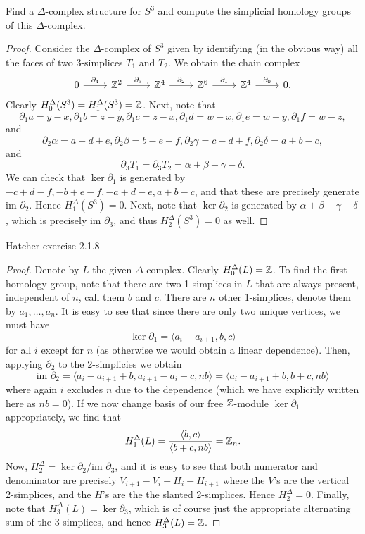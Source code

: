 \documentclass{../../mathnotes}
\begin{document}
\begin{prop}
    Find a $\Delta$-complex structure for $S^3$ and compute the simplicial homology groups
    of this $\Delta$-complex.
\end{prop}
\begin{proof}
    Consider the $\Delta$-complex of $S^3$ given by identifying (in the obvious way) all the faces of two 3-simplices $T_1$ and $T_2$.
    We obtain the chain complex
    \begin{equation*}
        \begin{tikzcd}
            0\arrow{r}{\partial_4}&\Z^2\arrow{r}{\partial_3}&\Z^4\arrow{r}{\partial_2}&\Z^6\arrow{r}{\partial_1}&\Z^4\arrow{r}{\partial_0}&0.
        \end{tikzcd}
    \end{equation*}
    Clearly $H^\Delta_0(S^3)=H^\Delta_1(S^3)=\mathbb{Z}$. Next, note that
    \[\partial_1a=y-x,\partial_1b=z-y,\partial_1c=z-x,\partial_1d=w-x,\partial_1e=w-y,\partial_1f=w-z,\]
    and
    \[\partial_2\alpha=a-d+e,\partial_2\beta=b-e+f,\partial_2\gamma=c-d+f,\partial_2\delta=a+b-c,\]
    and
    \[\partial_3T_1=\partial_3T_2=\alpha+\beta-\gamma-\delta.\]
    We can check that $\ker\partial_1$ is generated by $-c+d-f,-b+e-f,-a+d-e,a+b-c$, and that these are precisely generate
    $\text{im }\partial_2$. Hence $H^\Delta_1(S^3)=0$. Next, note that $\ker\partial_2$ is generated by $\alpha+\beta-\gamma-\delta$,
    which is precisely $\text{im }\partial_3$, and thus $H^\Delta_2(S^3)=0$ as well.
\end{proof}


\begin{prop}
    Hatcher exercise 2.1.8
\end{prop}
\begin{proof}
    Denote by $L$ the given $\Delta$-complex. Clearly $H^\Delta_0(L)=\mathbb{Z}$. To find the first homology group, note that
    there are two 1-simplices in $L$ that are always present, independent of $n$, call them $b$ and $c$. There are $n$
    other 1-simplices, denote them by $a_1,\ldots,a_n$. It is easy to see that since there are only two unique vertices,
    we must have
    \[\ker\partial_1=\langle a_i-a_{i+1},b,c\rangle\]
    for all $i$ except for $n$ (as otherwise we would obtain a linear dependence). Then, applying $\partial_2$
    to the 2-simplicies we obtain
    \[\text{im }\partial_2=\langle a_i-a_{i+1}+b, a_{i+1}-a_i+c,nb\rangle=\langle a_i-a_{i+1}+b,b+c,nb\rangle \]
    where again $i$ excludes $n$ due to the dependence (which we have explicitly written here as $nb=0$).
    If we now change basis of our free $\mathbb{Z}$-module $\ker\partial_1$ appropriately, we find that
    \[H_1^\Delta(L)=\frac{\langle b,c\rangle}{\langle b+c,nb\rangle}=\mathbb{Z}_n.\]
    Now, $H_2^\Delta=\ker\partial_2/\text{im }\partial_3$, and it is easy to see that both numerator and denominator
    are precisely $V_{i+1}-V_i+H_i-H_{i+1}$ where the $V$'s are the vertical 2-simplices, and the $H$'s are the
    the slanted 2-simplices. Hence $H_2^\Delta=0$. Finally, note that $H^\Delta_3(L)=\ker\partial_3$, which is of course 
    just the appropriate alternating sum of the 3-simplices, and hence $H^\Delta_3(L)=\mathbb{Z}$.
\end{proof}
\end{document}

